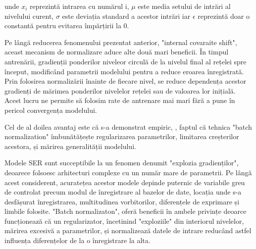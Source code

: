 \documentclass[a4paper,12pt]{book}
\begin{document}
				\quad unde $x_i$ reprezintă intrarea cu numărul i, $\mu$ este media setului de intrări al nivelului curent, $\sigma$ este deviația standard a acestor intrări iar $\epsilon$ reprezintă doar o constantă pentru evitarea împărțirii la 0.
				
				Pe lângă reducerea fenomenului prezentat anterior, "internal covaraite shift", aceast mecanism de normalizare aduce alte două mari beneficii. În timpul antrenării, gradienții ponderilor niveleor circulă de la nivelul final al rețelei spre început, modificând parametrii modelului pentru a reduce eroarea înregistrată.
				Prin folosirea normalizării înainte de fiecare nivel, se reduce dependența acestor gradienți de mărimea ponderilor nivelelor rețelei sau de valoarea lor inițială. Acest lucru ne permite să folosim rate de antrenare mai mari fără a pune în pericol convergența modelului. \par
				Cel de al doilea avantaj este că s-a demonstrat empiric, \cite{batch_norm}, faptul că tehnica "batch normalization" îmbunătățește regularizarea parametrilor, limitarea creșterilor acestora, și mărirea generalității modelului. \par
				Modele SER sunt succeptibile la un fenomen denumit "explozia gradienților", deoarece folsoesc arhitecturi complexe cu un număr mare de parametrii. Pe lângă acest considerent, acuratețea acestor modele depinde puternic de variabile greu de controlat precum modul de înregistrare al bazelor de date, locația unde s-a desfășurat înregistrarea, multitudinea vorbitorilor, diferențele de exprimare și limbile folosite. "Batch normalizaton", oferă beneficii în ambele privințe deoarce funcționează că un regularizator, încetinind "exploziile" din interiorul nivelelor, mărirea excesivă a parametrilor, și normalizează datele de intrare reducând astfel influența diferențelor de la o înregistrare la alta. \par
\end{document}
